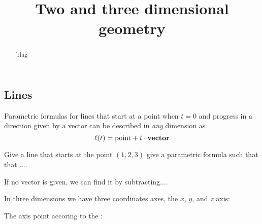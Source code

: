 \documentclass{ximera}
\title[Dig-In:]{Two and three dimensional geometry}
\begin{document}
\begin{abstract}
  blug
\end{abstract}
\maketitle

\subsection{Lines}

Parametric formulas for lines that start at a point when $t=0$ and
progress in a direction given by a vector can be described in
\textit{any} dimension as
\[
\ell(t) = \mathrm{point} + t\cdot \mathbf{vector}
\]
\begin{question}
  Give a line that starts at the point $(1,2,3)$ give a parametric
  formula such that that ....
\end{question}

If no vector is given, we can find it by subtracting.... 


In three dimensions we have three coordinates axes, the $x$, $y$, and
$z$ axis:

\begin{image}
\end{image}

The axis point accoring to the :
\end{document}
